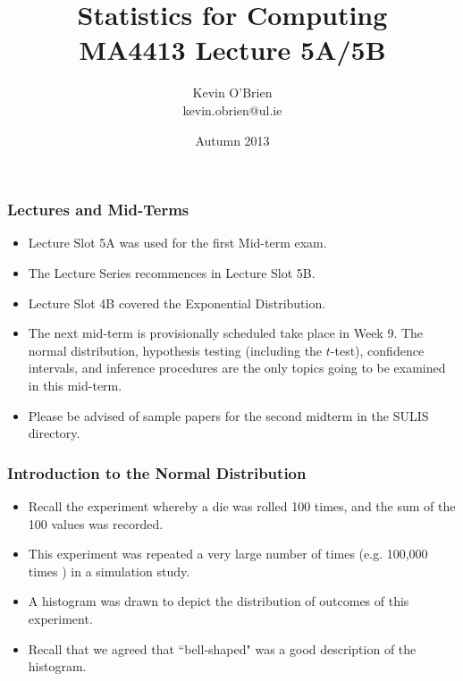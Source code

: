 \documentclass[a4]{beamer}
\title[MA4413]{Statistics for Computing \\ {\normalsize MA4413 Lecture 5A/5B}}
\author[Kevin O'Brien]{Kevin O'Brien \\ {\scriptsize kevin.obrien@ul.ie}}
\date{Autumn 2013}
\institute[Maths \& Stats]{Dept. of Mathematics \& Statistics, \\ University \textit{of} Limerick}
\begin{document}
\begin{frame}
\titlepage
\end{frame}
\begin{frame}
\frametitle{Lectures and Mid-Terms}
\begin{itemize}
\item Lecture Slot 5A was used for the first Mid-term exam.\\
\item The Lecture Series recommences in Lecture Slot 5B.
\item Lecture Slot 4B covered the Exponential Distribution. 
\item The next mid-term is provisionally scheduled take place in Week 9. The normal distribution, hypothesis testing (including the $t$-test), confidence intervals, and inference procedures are the only topics going to be examined in this mid-term.
\item Please be advised of sample papers for the second midterm in the SULIS directory.
\end{itemize}
\end{frame}
\begin{frame}

\frametitle{Introduction to the Normal Distribution}
\begin{itemize}
\item
Recall the experiment whereby a die was rolled 100 times, and the sum of the 100 values was recorded.
\item
This experiment was repeated a very large number of times (e.g. 100,000 times ) in a simulation study.
\item
A histogram was drawn to depict the distribution of outcomes of this experiment.
\item Recall that we agreed that ``bell-shaped" was a good description of the histogram.

\end{itemize}
\end{frame}


\end{document}
